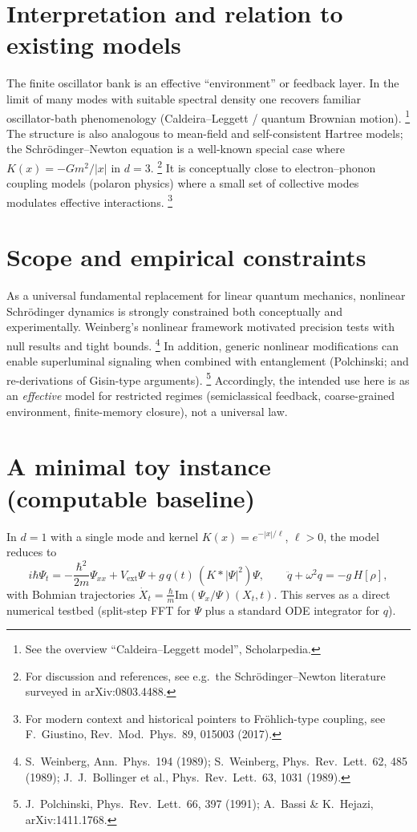 \documentclass[11pt]{article}
\begin{document}
\section{Interpretation and relation to existing models}
The finite oscillator bank is an effective ``environment'' or feedback layer.
In the limit of many modes with suitable spectral density one recovers familiar oscillator-bath
phenomenology (Caldeira--Leggett / quantum Brownian motion).%
\footnote{See the overview ``Caldeira--Leggett model'', Scholarpedia.}
The structure is also analogous to mean-field and self-consistent Hartree models; the
Schr\"odinger--Newton equation is a well-known special case where $K(x)= -Gm^2/|x|$ in $d=3$.%
\footnote{For discussion and references, see e.g.\ the Schr\"odinger--Newton literature surveyed in arXiv:0803.4488.}
It is conceptually close to electron--phonon coupling models (polaron physics) where a small set of
collective modes modulates effective interactions.%
\footnote{For modern context and historical pointers to Fr\"ohlich-type coupling, see F.\ Giustino, Rev.\ Mod.\ Phys.\ 89, 015003 (2017).}

\section{Scope and empirical constraints}
As a universal fundamental replacement for linear quantum mechanics, nonlinear Schr\"odinger
dynamics is strongly constrained both conceptually and experimentally.
Weinberg's nonlinear framework motivated precision tests with null results and tight bounds.%
\footnote{S.\ Weinberg, Ann.\ Phys.\ 194 (1989); S.\ Weinberg, Phys.\ Rev.\ Lett.\ 62, 485 (1989);
J.\ J.\ Bollinger et al., Phys.\ Rev.\ Lett.\ 63, 1031 (1989).}
In addition, generic nonlinear modifications can enable superluminal signaling when combined with
entanglement (Polchinski; and re-derivations of Gisin-type arguments).%
\footnote{J.\ Polchinski, Phys.\ Rev.\ Lett.\ 66, 397 (1991); A.\ Bassi \& K.\ Hejazi, arXiv:1411.1768.}
Accordingly, the intended use here is as an \emph{effective} model for restricted regimes
(semiclassical feedback, coarse-grained environment, finite-memory closure), not a universal law.

\section{A minimal toy instance (computable baseline)}
In $d=1$ with a single mode and kernel $K(x)=e^{-|x|/\ell}$, $\ell>0$, the model reduces to
\[
i\hbar\Psi_t=-\frac{\hbar^2}{2m}\Psi_{xx}+V_{\mathrm{ext}}\Psi+g\,q(t)\,(K*|\Psi|^2)\Psi,\qquad
\ddot q+\omega^2 q=-g\,H[\rho],
\]
with Bohmian trajectories $\dot X_t = \frac{\hbar}{m}\mathrm{Im}(\Psi_x/\Psi)(X_t,t)$.
This serves as a direct numerical testbed (split-step FFT for $\Psi$ plus a standard ODE integrator for $q$).
\end{document}
